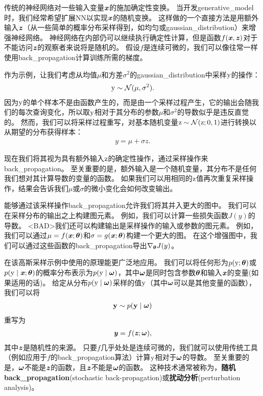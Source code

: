 传统的神经网络对一些输入变量$\boldsymbol{\mathit{x}}$的施加确定性变换。
当开发\gls{generative_model}时，我们经常希望扩展\gls{NN}以实现$\boldsymbol{\mathit{x}}$的随机变换。
这样做的一个直接方法是用额外输入$\boldsymbol{\mathit{z}}$（从一些简单的概率分布采样得到，如均匀或\gls{gaussian_distribution}）来增强神经网络。
神经网络在内部仍可以继续执行确定性计算，但是函数$f(\boldsymbol{\mathit{x}},\boldsymbol{\mathit{z}})$对于不能访问$\boldsymbol{\mathit{z}}$的观察者来说将是随机的。
假设$f$是连续可微的，我们可以像往常一样使用\gls{back_propagation}计算训练所需的梯度。

作为示例，让我们考虑从均值$\mu$和方差$\sigma^2$的\gls{gaussian_distribution}中采样$\mathrm{y}$的操作：
\begin{align}
 \mathrm{y} \sim \mathcal{N}(\mu, \sigma^2).
\end{align}
因为$\mathrm{y}$的单个样本不是由函数产生的，而是由一个采样过程产生，它的输出会随我们的每次查询变化，所以取$\mathrm{y}$相对于其分布的参数$\mu$和$\sigma^2$的导数似乎是违反直觉的。
然而，我们可以将采样过程重写，对基本随机变量$\mathrm{z} \sim \mathcal{N}(\mathrm{z};0,1)$进行转换以从期望的分布获得样本：
\begin{align}
 y = \mu + \sigma z.
\end{align}

现在我们将其视为具有额外输入$\mathrm{z}$的确定性操作，通过采样操作来\gls{back_propagation}。
至关重要的是，额外输入是一个随机变量，其分布不是任何我们想对其计算导数的变量的函数。
如果我们可以用相同的$\mathrm{z}$值再次重复采样操作，结果会告诉我们$\mu$或$\sigma$的微小变化会如何改变输出。


能够通过该采样操作\gls{back_propagation}允许我们将其并入更大的图中。
我们可以在采样分布的输出之上构建图元素。
例如，我们可以计算一些损失函数$J(y)$的导数。
<BAD>我们还可以构建输出是采样操作的输入或参数的图元素。
例如，我们可以通过$\mu = f(\boldsymbol{\mathit{x}}; \boldsymbol{\theta})$和$\sigma = g(\boldsymbol{\mathit{x}}; \boldsymbol{\theta})$构建一个更大的图。
在这个增强图中，我们可以通过这些函数的\gls{back_propagation}导出$\nabla_{\boldsymbol{\theta}} J(y)$。

在该高斯采样示例中使用的原理能更广泛地应用。
我们可以将任何形为$p(\mathrm{y};\boldsymbol{\theta})$或$p(\mathrm{y} \mid \boldsymbol{\mathit{x}};\boldsymbol{\theta})$的概率分布表示为$p(\mathrm{y} \mid \boldsymbol{\omega})$，其中$\boldsymbol{\omega}$是同时包含参数$\boldsymbol{\theta}$和输入$\boldsymbol{\mathit{x}}$的变量(如果适用的话)。
给定从分布$p(\mathrm{y} \mid \boldsymbol{\omega})$采样的值$\mathrm{y}$（其中$\boldsymbol{\omega}$可以是其他变量的函数），我们可以将
\begin{align}
 \mathbf{y} \sim p(\mathbf{y}  \mid  \boldsymbol{\omega})
\end{align}
重写为
\begin{align}
 \boldsymbol{\mathit{y}} = f(\boldsymbol{\mathit{z}}; \boldsymbol{\omega}),
\end{align}
其中$\boldsymbol{\mathit{z}}$是随机性的来源。
只要$f$几乎处处是连续可微的，我们就可以使用传统工具（例如应用于$f$的\gls{back_propagation}算法）计算$\mathrm{y}$相对于$\boldsymbol{\omega}$的导数。
至关重要的是，$\boldsymbol{\omega}$不能是$\boldsymbol{\mathit{z}}$的函数，且$\boldsymbol{\mathit{z}}$不能是$\boldsymbol{\omega}$的函数。
这种技术通常被称为，\textbf{随机\gls{back_propagation}}(stochastic back-propagation)或\textbf{扰动分析}(perturbation analysis)。


